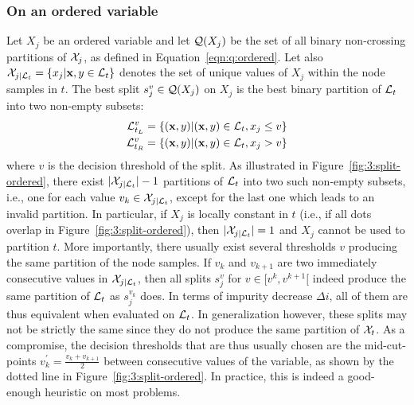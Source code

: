 \subsubsection{On an ordered variable}
\label{sec:best-split-ordered}

Let $X_j$ be an ordered variable and let ${\cal Q}(X_j)$ be the set of all
binary non-crossing partitions of ${\cal X}_j$, as defined in
Equation~\ref{eqn:q:ordered}. Let also ${\cal X}_{j|{\cal L}_t} = \{ x_j |
\mathbf{x},y \in {\cal L}_t \}$ denotes the set of unique values of $X_j$
within the node samples in $t$.  The best split $s^v_j \in {\cal Q}(X_j)$ on $X_j$
 is the best binary partition  of ${\cal L}_t$ into two non-empty subsets:
\begin{align*}
{\cal L}^v_{t_L} &= \{(\mathbf{x}, y)|(\mathbf{x}, y)\in {\cal L}_t, x_j \leq v\}\\
{\cal L}^v_{t_R} &= \{(\mathbf{x}, y)|(\mathbf{x}, y)\in {\cal L}_t, x_j > v\}
\end{align*}
where $v$ is the decision threshold of the split. As illustrated in
Figure~\ref{fig:3:split-ordered}, there exist $|{\cal X}_{j|{\cal
L}_t}|-1$ partitions of ${\cal L}_t$ into two such non-empty subsets, i.e., one
for each value $v_k \in {\cal X}_{j|{\cal L}_t}$, except for the last one which
leads to an invalid partition. In particular, if $X_j$ is locally constant in
$t$ (i.e., if all dots overlap in Figure~\ref{fig:3:split-ordered}), then
$|{\cal X}_{j|{\cal L}_t}|=1$ and $X_j$ cannot be used to partition $t$. More
importantly, there usually exist several thresholds $v$ producing the same
partition of the node samples. If $v_k$ and $v_{k+1}$ are two immediately
consecutive values in  ${\cal X}_{j|{\cal L}_t}$, then all splits $s^{v}_j$ for
$v \in [v^k, v^{k+1}[$ indeed produce the same partition of ${\cal L}_t$ as
$s^{v_k}_j$ does. In terms of impurity decrease $\Delta i$, all of them are
thus equivalent when evaluated on ${\cal L}_t$. In generalization however,
these splits may not be strictly the same since they do not produce the same
partition of ${\cal X}_t$. As a compromise, the decision thresholds that are
thus usually chosen are the mid-cut-points $v^\prime_k=\tfrac{v_k+v_{k+1}}{2}$
between consecutive values of the variable, as shown by the dotted line in
Figure~\ref{fig:3:split-ordered}. In practice, this is indeed a good-enough
heuristic on most problems.

